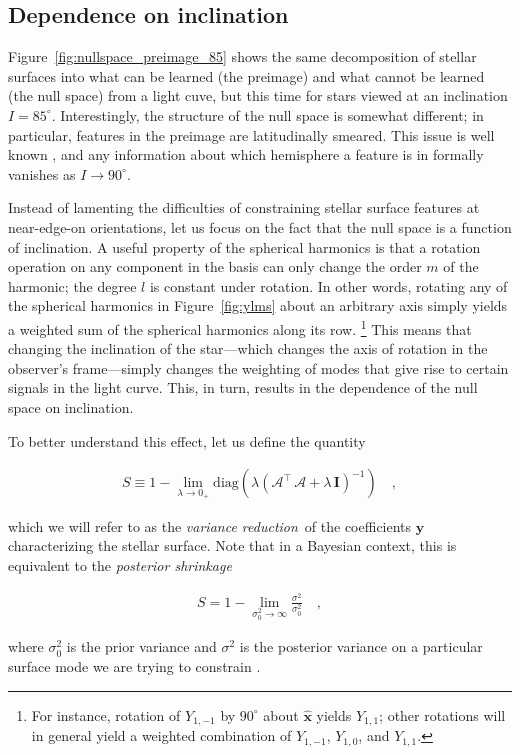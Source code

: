 \documentclass[modern,linenumbers]{aastex62}
\newcommand{\shrinkage}{{variance reduction\,}}
\begin{document}
\subsection{Dependence on inclination}
\label{sec:inclination}

Figure~\ref{fig:nullspace_preimage_85} shows the same decomposition
of stellar surfaces into what can be learned (the preimage) and what
cannot be learned (the null space) from a light cuve, but this time
for stars viewed at an inclination $I = 85^\circ$. Interestingly,
the structure of the null space is somewhat different; in particular,
features in the preimage are latitudinally smeared. This
issue is well known \citep[e.g.,][]{Cowan2009,Basri2020}, and any
information about which hemisphere a feature is in formally vanishes
as $I \rightarrow 90^\circ$.

Instead of lamenting the difficulties of constraining stellar surface features
at near-edge-on orientations, let us focus on the fact that the
null space is a function of inclination.
%
A useful property of
the spherical harmonics is that a rotation operation on any
component in the basis can only change the order $m$ of the
harmonic; the degree $l$ is constant under rotation. In other
words, rotating any of the spherical harmonics in Figure~\ref{fig:ylms}
about an arbitrary axis simply yields a weighted sum of the spherical
harmonics along its row.%
\footnote{For instance, rotation of $Y_{1,-1}$ by $90^\circ$ about
    $\hat{\mathbf{x}}$ yields $Y_{1,1}$; other rotations will in general
    yield a weighted combination of $Y_{1,-1}$, $Y_{1,0}$, and $Y_{1,1}$.}
This means that changing the inclination of the star---which changes
the axis of rotation in the observer's frame---simply changes the weighting
of modes that give rise to certain signals in the light curve.
This, in turn, results in the dependence of the null space on inclination.

To better understand this effect, let us define the quantity
%
\begin{linenomath}\begin{align}
        S \equiv
        1 -
        \lim_{\lambda \rightarrow 0_+}
        \mathrm{diag}
        \left(
        \lambda
        \left(\pmb{\mathcal{A}}^\top\,\pmb{\mathcal{A}} + \lambda\,\mathbf{I}\right)^{-1}
        \right)
        \quad,
    \end{align}\end{linenomath}
%
which we will refer to as the \emph{\shrinkage}
of the coefficients $\mathbf{y}$ characterizing the stellar surface.
Note that in a Bayesian context, this is
equivalent to the \emph{posterior shrinkage}
%
\begin{linenomath}\begin{align}
        \label{eq:shrinkage}
        S = 1 - \lim\limits_{\sigma_0^2 \rightarrow \infty}
        \frac{\sigma^2}{\sigma_0^2}
        \quad,
    \end{align}\end{linenomath}
%
where $\sigma_0^2$ is the prior variance
and $\sigma^2$ is the posterior variance
on a particular surface mode we are trying to constrain
\citep[see, e.g.,][]{Betancourt2018}.
\end{document}
